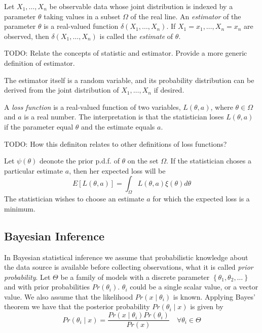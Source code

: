 {\color{red}

\begin{definition}
Let $X_1, \ldots, X_n$ be observable data whose joint distribution is indexed by a parameter $\theta$ taking values in a subset $\Omega$ of the real line. An \emph{estimator} of the parameter $\theta$ is a real-valued function $\delta \left( X_1, \ldots, X_n \right)$. If $X_1=x_1, \ldots, X_n=x_n$ are observed, then $\delta \left( X_1, \ldots, X_n \right)$ is called the \emph{estimate} of $\theta$.
\end{definition}

TODO: Relate the concepts of statistic and estimator. Provide a more generic definition of estimator.

The estimator itself is a random variable, and its probability distribution can be derived from the joint distribution of $X_1, \ldots, X_n$ if desired.

\begin{definition}

A \emph{loss function} is a real-valued function of two variables, $L \left( \theta, a \right)$, where $\theta \in \Omega$ and $a$ is a real number. The interpretation is that the statistician loses $L \left( \theta, a \right)$ if the parameter equal $\theta$ and the estimate equals $a$.

\end{definition}

TODO: How this definiton relates to other definitions of loss functions?

Let $\psi \left( \theta \right)$ deonote the prior p.d.f. of $\theta$ on the set $\Omega$. If the statistician choses a particular estimate $a$, then her expected loss will be
\[
E\left[L\left(\theta,a\right)\right]=\int_{\Omega}L\left(\theta,a\right)\xi\left(\theta\right)d\theta
\]
The statistician wishes to choose an estimate $a$ for which the expected loss is a minimum.
}


\subsection{Bayesian Inference}

In Bayesian statistical inference we assume that probabilistic knowledge about the data source is available before collecting observations, what it is called \emph{prior probability}. Let $\Theta$ be a family of models with a discrete parameter $\left\{ \theta_1,\theta_2,\ldots \right\}$ and with prior probabilities $Pr\left(\theta_i \right)$. {\color{red} $\theta_i$ could be a single scalar value, or a vector value.} We also assume that the likelihood $Pr\left(x \mid \theta_i \right)$ is known. Applying Bayes' theorem we have that the posterior probability $Pr\left(\theta_i \mid x\right)$ is given by
\[
    Pr\left(\theta_i \mid x\right) = \frac{Pr\left(x\mid\theta_i\right) Pr\left(\theta_i \right)}{Pr\left(x\right)} \quad \forall \theta_i \in \Theta
\]

